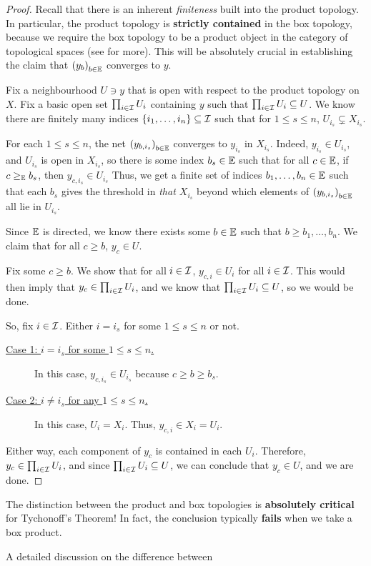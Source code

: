 \begin{proof}
    Recall that there is an inherent \textit{finiteness} built into the product topology. In particular, the product topology is \textbf{strictly contained} in the box topology, because we require the box topology to be a product object in the category of topological spaces (see  for more). This will be absolutely crucial in establishing the claim that $\left( y_b \right)_{b \in \mathbb{E}}$ converges to $y$.

    Fix a neighbourhood $U \ni y$ that is open with respect to the product topology on $X$. Fix a basic open set $\prod_{i \in \mathcal{I}} U_i$ containing $y$ such that $\prod_{i \in \mathcal{I}} U_i \subseteq U$. We know there are finitely many indices $\left\{ i_1, \ldots, i_n \right\} \subseteq \mathcal{I}$ such that for $1 \leq s \leq n$, $U_{i_s} \subsetneq X_{i_s}$.

    For each $1 \leq s \leq n$, the net $\left( y_{b, i_s} \right)_{b \in \mathbb{E}}$ converges to $y_{i_s}$ in $X_{i_s}$. Indeed, $y_{i_s} \in U_{i_s}$, and $U_{i_s}$ is open in $X_{i_s}$, so there is some index $b_s \in \mathbb{E}$ such that for all $c \in \mathbb{E}$, if $c \geq_{\mathbb{E}} b_s$, then ${y_{c, i_s}} \in U_{i_s}$ Thus, we get a finite set of indices $b_1, \ldots, b_n \in \mathbb{E}$ such that each $b_s$ gives the threshold in \textit{that $X_{i_s}$} beyond which elements of $\left( y_{b, i_s} \right)_{b \in \mathbb{E}}$ all lie in $U_{i_s}$.

    Since $\mathbb{E}$ is directed, we know there exists some $b \in \mathbb{E}$ such that $b \geq b_1, \ldots, b_n$. We claim that for all $c \geq b$, $y_c \in U$.

    Fix some $c \geq b$. We show that for all $i \in \mathcal{I}$, $y_{c, i} \in U_i$ for all $i \in \mathcal{I}$. This would then imply that $y_c \in \prod_{i \in \mathcal{I}} U_i$, and we know that $ \prod_{i \in \mathcal{I}} U_i \subseteq U$, so we would be done.

    So, fix $i \in \mathcal{I}$. Either $i = i_s$ for some $1 \leq s \leq n$ or not.
    \begin{description}
        \item[\underline{Case 1: $i = i_s$ for some $1 \leq s \leq n$.}]
        In this case, $y_{c, i_s} \in U_{i_s}$ because $c \geq b \geq b_s$.

        \item[\underline{Case 2: $i \neq i_s$ for any $1 \leq s \leq n$.}]
        In this case, $U_i = X_i$. Thus, $y_{c, i} \in X_i = U_i$.
    \end{description}
    Either way, each component of $y_c$ is contained in each $U_i$. Therefore, $y_c \in \prod_{i \in \mathcal{I}} U_i$, and since $\prod_{i \in \mathcal{I}} U_i \subseteq U$, we can conclude that $y_c \in U$, and we are done.
\end{proof}

\begin{boxwarning}
    The distinction between the product and box topologies is \textbf{absolutely critical} for Tychonoff's Theorem! In fact, the conclusion typically \textbf{fails} when we take a box product.
\end{boxwarning}

A detailed discussion on the difference between 
